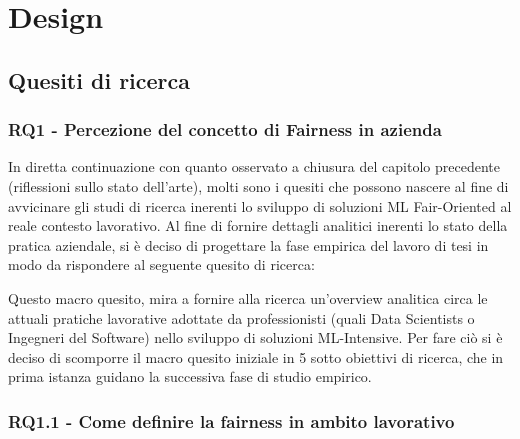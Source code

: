 \chapter{Design} %
%
    \section{Quesiti di ricerca}
    \subsection{RQ1 - Percezione del concetto di Fairness in azienda}
    
    In diretta continuazione con quanto osservato a chiusura del capitolo precedente (riflessioni sullo stato dell'arte), molti sono i quesiti che possono nascere al fine di avvicinare gli studi di ricerca inerenti lo sviluppo di soluzioni ML Fair-Oriented al reale contesto lavorativo. Al fine di fornire dettagli analitici inerenti lo stato della pratica aziendale, si è deciso di progettare la fase empirica del lavoro di tesi in modo da rispondere al seguente quesito di ricerca:
    
    \begin{center}
		\hspace*{-5mm}%
	\end{center}
	
	Questo macro quesito, mira a fornire alla ricerca un'overview analitica circa le attuali pratiche lavorative adottate da professionisti (quali Data Scientists o Ingegneri del Software) nello sviluppo di soluzioni ML-Intensive. Per fare ciò si è deciso di scomporre il macro quesito iniziale in 5 sotto obiettivi di ricerca, che in prima istanza guidano la successiva fase di studio empirico.\\
	
	\subsection{RQ1.1 - Come definire la fairness in ambito lavorativo}
	\begin{center}
			\hspace*{-5mm}%
	\end{center}


